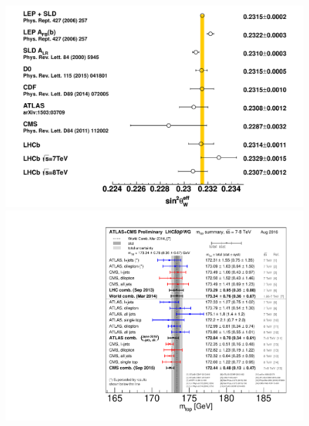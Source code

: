 \documentclass{blois}
\begin{document}
\begin{figure}
\begin{minipage}{0.39\linewidth}
\centerline{\includegraphics[width=0.95\linewidth]{figures/stw_comp_fullref_final}}
\end{minipage}
\begin{minipage}{0.32\linewidth}
\centerline{\includegraphics[width=0.95\linewidth]{figures/LHC_topmass_aug2016}}
\end{minipage}
\begin{minipage}{0.26\linewidth}

\end{minipage}
\end{figure}
\end{document}
